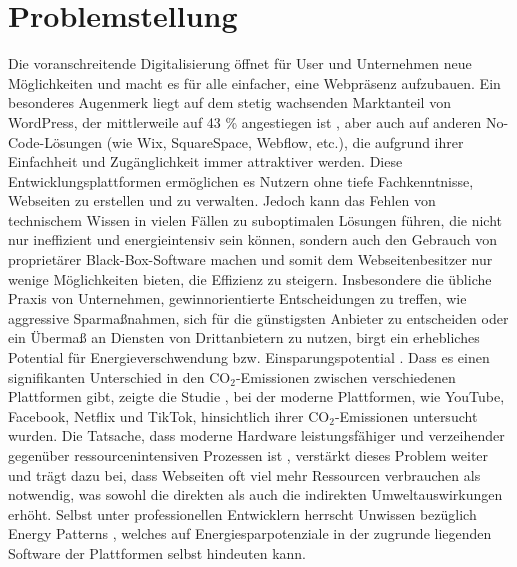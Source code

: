 \documentclass[Bachelor,BIF,german,IEEE]{BASE/twbook}
\begin{document}
\section{Problemstellung}
\noindent Die voranschreitende Digitalisierung öffnet für User und Unternehmen neue Möglichkeiten und macht es für alle einfacher, eine Webpräsenz aufzubauen. Ein besonderes Augenmerk liegt auf dem stetig wachsenden Marktanteil von WordPress, der mittlerweile auf 43 \% angestiegen ist  \cite{WP42}, aber auch auf anderen No-Code-Lösungen (wie Wix, SquareSpace, Webflow, etc.), die aufgrund ihrer Einfachheit und Zugänglichkeit immer attraktiver werden.
Diese Entwicklungsplattformen ermöglichen es Nutzern ohne tiefe Fachkenntnisse, Webseiten zu erstellen und zu verwalten. Jedoch kann das Fehlen von technischem Wissen in vielen Fällen zu suboptimalen Lösungen führen, die nicht nur ineffizient und energieintensiv sein können, sondern auch den Gebrauch von proprietärer Black-Box-Software machen und somit dem Webseitenbesitzer nur wenige Möglichkeiten bieten, die Effizienz zu steigern. Insbesondere die übliche Praxis von Unternehmen, gewinnorientierte Entscheidungen zu treffen, wie aggressive Sparmaßnahmen, sich für die günstigsten Anbieter zu entscheiden oder ein Übermaß an Diensten von Drittanbietern zu nutzen, birgt ein erhebliches Potential für Energieverschwendung bzw. Einsparungspotential  \cite{CIO24}. Dass es einen signifikanten Unterschied in den CO$_2$-Emissionen zwischen verschiedenen Plattformen gibt, zeigte die Studie  \cite{SM22}, bei der moderne Plattformen, wie YouTube, Facebook, Netflix und TikTok, hinsichtlich ihrer CO$_2$-Emissionen untersucht wurden. Die Tatsache, dass moderne Hardware leistungsfähiger und verzeihender gegenüber ressourcenintensiven Prozessen ist  \cite{HW20}, verstärkt dieses Problem weiter und trägt dazu bei, dass Webseiten oft viel mehr Ressourcen verbrauchen als notwendig, was sowohl die direkten als auch die indirekten Umweltauswirkungen erhöht. Selbst unter professionellen Entwicklern herrscht Unwissen bezüglich Energy Patterns  \cite{EnP24}, welches auf Energiesparpotenziale in der zugrunde liegenden Software der Plattformen selbst hindeuten kann.
\end{document}
